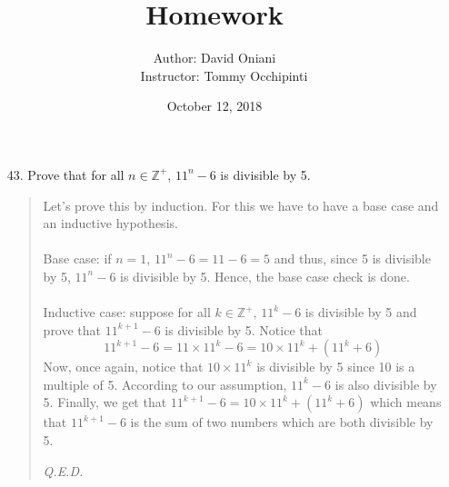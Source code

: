 \documentclass[12pt, a4paper]{article}                      %
\title{\bf{Homework \textnumero 7}}
\author{Author: David Oniani
\\
\ \ \ Instructor: Tommy Occhipinti}
\date{October 12, 2018}
\newcommand{\intzp}{\mathbb{Z^+}}
\begin{document}
\maketitle


\begin{itemize}
\item[43.]
Prove that for all $n \in \intzp$, $11^n - 6$ is divisible by 5.
\begin{quote}
Let's prove this by induction. For this we have to have a base case
and an inductive hypothesis.\\\\
Base case: if $n = 1$, $11^n - 6 = 11 - 6 = 5$ and thus, since 5 is divisible by 5, $11^n - 6$ is divisible by 5. Hence, the base case check is done.\\\\
Inductive case: suppose for all $k \in \intzp$, $11^k - 6$ is divisible by 5 and prove that $11^{k + 1} - 6$ is divisible by 5.
Notice that
$$11^{k + 1} - 6 = 11 \times 11^k - 6 = 10 \times 11^k + (11^k + 6)$$
Now, once again, notice that $10 \times 11^k$ is divisible by 5 since 10 is a multiple of 5. According to our assumption,
$11^k - 6$ is also divisible by 5.
Finally, we get that $11^{k + 1} - 6 = 10\times 11^k + (11^k + 6)$ which means that $11^{k + 1} - 6$ is the sum of two numbers which
are both divisible by 5.
\begin{flushright}
\textit{Q.E.D.}
\end{flushright}
\end{quote}

\item[]


\end{itemize}
\end{document}
